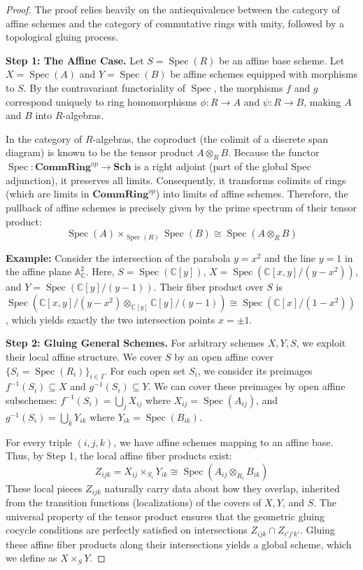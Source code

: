 \begin{proof}
The proof relies heavily on the antiequivalence between the category of affine schemes and the category of commutative rings with unity, followed by a topological gluing process.

\textbf{Step 1: The Affine Case.} 
Let $S = \operatorname{Spec}(R)$ be an affine base scheme. Let $X = \operatorname{Spec}(A)$ and $Y = \operatorname{Spec}(B)$ be affine schemes equipped with morphisms to $S$. By the contravariant functoriality of $\operatorname{Spec}$, the morphisms $f$ and $g$ correspond uniquely to ring homomorphisms $\phi: R \to A$ and $\psi: R \to B$, making $A$ and $B$ into $R$-algebras.

In the category of $R$-algebras, the coproduct (the colimit of a discrete span diagram) is known to be the tensor product $A \otimes_R B$.
Because the functor $\operatorname{Spec}: \mathbf{CommRing}^{op} \to \mathbf{Sch}$ is a right adjoint (part of the global Spec adjunction), it preserves all limits. Consequently, it transforms colimits of rings (which are limits in $\mathbf{CommRing}^{op}$) into limits of affine schemes. Therefore, the pullback of affine schemes is precisely given by the prime spectrum of their tensor product:
\[
\operatorname{Spec}(A) \times_{\operatorname{Spec}(R)} \operatorname{Spec}(B) \cong \operatorname{Spec}(A \otimes_R B)
\]

\textbf{Example:} Consider the intersection of the parabola $y = x^2$ and the line $y = 1$ in the affine plane $\mathbb{A}^2_\mathbb{C}$. Here, $S = \operatorname{Spec}(\mathbb{C}[y])$, $X = \operatorname{Spec}(\mathbb{C}[x,y]/(y-x^2))$, and $Y = \operatorname{Spec}(\mathbb{C}[y]/(y-1))$. Their fiber product over $S$ is $\operatorname{Spec}(\mathbb{C}[x,y]/(y-x^2) \otimes_{\mathbb{C}[y]} \mathbb{C}[y]/(y-1)) \cong \operatorname{Spec}(\mathbb{C}[x]/(1-x^2))$, which yields exactly the two intersection points $x = \pm 1$.

\textbf{Step 2: Gluing General Schemes.}
For arbitrary schemes $X, Y, S$, we exploit their local affine structure. We cover $S$ by an open affine cover $\{S_i = \operatorname{Spec}(R_i)\}_{i \in I}$. For each open set $S_i$, we consider its preimages $f^{-1}(S_i) \subseteq X$ and $g^{-1}(S_i) \subseteq Y$. We can cover these preimages by open affine subschemes: $f^{-1}(S_i) = \bigcup_j X_{ij}$ where $X_{ij} = \operatorname{Spec}(A_{ij})$, and $g^{-1}(S_i) = \bigcup_k Y_{ik}$ where $Y_{ik} = \operatorname{Spec}(B_{ik})$.

For every triple $(i, j, k)$, we have affine schemes mapping to an affine base. Thus, by Step 1, the local affine fiber products exist:
\[
Z_{ijk} = X_{ij} \times_{S_i} Y_{ik} \cong \operatorname{Spec}(A_{ij} \otimes_{R_i} B_{ik})
\]
These local pieces $Z_{ijk}$ naturally carry data about how they overlap, inherited from the transition functions (localizations) of the covers of $X, Y$, and $S$. The universal property of the tensor product ensures that the geometric gluing cocycle conditions are perfectly satisfied on intersections $Z_{ijk} \cap Z_{i'j'k'}$. Gluing these affine fiber products along their intersections yields a global scheme, which we define as $X \times_S Y$.


\end{proof}
